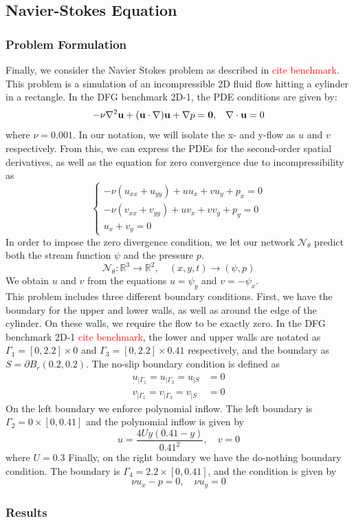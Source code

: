 \subsection{Navier-Stokes Equation}
\subsubsection{Problem Formulation}
Finally, we consider the Navier Stokes problem as described in \textcolor{red}{cite benchmark}. This problem is a simulation of an incompressible 2D fluid flow hitting a cylinder in a rectangle. In the DFG benchmark 2D-1, the PDE conditions are given by:
\begin{equation}
    -\nu \nabla^2 \mathbf{u} + (\mathbf{u} \cdot \nabla)\mathbf{u} + \nabla p = \mathbf{0}, \hspace{3mm} \nabla \cdot \mathbf{u} = 0
\end{equation}
where $\nu = 0.001$. In our notation, we will isolate the x- and y-flow as $u$ and $v$ respectively. From this, we can express the PDEs for the second-order spatial derivatives, as well as the equation for zero convergence due to incompressibility as
\begin{equation}
\begin{cases}
-\nu(u_{xx} + u_{yy})+uu_x+vu_y+p_x = 0 \\
-\nu(v_{xx} + v_{yy})+uv_x+vv_y+p_y = 0 \\
u_x + v_y = 0
\end{cases}
\end{equation}
In order to impose the zero divergence condition, we let our network $\mathcal{N}_\theta$ predict both the stream function $\psi$ and the pressure $p$.
\begin{equation}
    \mathcal{N}_\theta : \mathbb{R}^3 \to \mathbb{R}^2, \quad (x,y,t)\to (\psi, p)
\end{equation}
We obtain $u$ and $v$ from the equations $u=\psi_y$ and $v=-\psi_x$. \\
This problem includes three different boundary conditions. First, we have the boundary for the upper and lower walls, as well as around the edge of the cylinder. On these walls, we require the flow to be exactly zero. In the DFG benchmark 2D-1 \textcolor{red}{cite benchmark}, the lower and upper walls are notated as $\Gamma_1 = [0,2.2]\times 0$ and $\Gamma_3 = [0,2.2]\times 0.41$ respectively, and the boundary as $S=\partial B_r(0.2,0.2)$. The no-slip boundary condition is defined as
\begin{align*}
    u_{|\Gamma_1} = u_{|\Gamma_3} = u_{|S} &= 0 \\
    v_{|\Gamma_1} = v_{|\Gamma_3} = v_{|S} &= 0
\end{align*}
On the left boundary we enforce polynomial inflow. The left boundary is $\Gamma_2 = 0\times [0,0.41]$ and the polynomial inflow is given by
\begin{equation*}
    u=\frac{4Uy(0.41-y)}{0.41^2}, \quad v=0
\end{equation*}
where $U=0.3$
Finally, on the right boundary we have the do-nothing boundary condition. The boundary is $\Gamma_4=2.2\times[0,0.41]$, and the condition is given by
\begin{equation*}
    \nu u_x - p = 0, \quad \nu u_y = 0
\end{equation*}
\subsubsection{Results}
